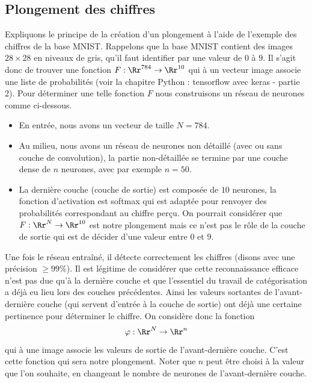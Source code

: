 \documentclass[11pt,class=report,crop=false]{standalone}
\begin{document}
\subsection{Plongement des chiffres}

Expliquons le principe de la création d'un plongement à l'aide de l'exemple des chiffres de la base MNIST.
Rappelons que la base MNIST contient des images $28 \times 28$ en niveaux de gris, qu'il faut identifier par une valeur de $0$ à $9$. Il s'agit donc de trouver une fonction $F : \Rr^{784} \to \Rr^{10}$ qui à un vecteur image associe une liste de probabilités (voir la chapitre \og{}Python : tensorflow avec keras - partie 2\fg{}).
Pour déterminer une telle fonction $F$ nous construisons un réseau de neurones comme ci-dessous.



\begin{itemize}
	\item En entrée, nous avons un vecteur de taille $N = 784$.
	
	\item Au milieu, nous avons un réseau de neurones non détaillé (avec ou sans couche de convolution), la partie non-détaillée se termine par une couche dense de $n$ neurones, avec par exemple $n=50$. 
	
	\item La dernière couche (couche de sortie) est composée de $10$ neurones, la fonction d'activation est softmax qui est adaptée pour renvoyer des probabilités correspondant au chiffre perçu. On pourrait considérer que $F : \Rr^N \to \Rr^{10}$ est notre plongement mais ce n'est pas le rôle de la couche de sortie qui est de décider d'une valeur entre $0$ et $9$.
	
\end{itemize}
	
Une fois le réseau entraîné, il détecte correctement les chiffres (disons avec une précision $\ge 99\%$). Il est légitime de considérer que cette reconnaissance efficace n'est pas due qu'à la dernière couche et que l'essentiel du travail de catégorisation a déjà eu lieu lors des couches précédentes.
Ainsi les valeurs sortantes de l'avant-dernière couche (qui servent d'entrée à la couche de sortie) ont déjà une certaine pertinence pour déterminer le chiffre.
On considère donc la fonction 
$$\varphi : \Rr^N \to \Rr^n$$
qui à une image associe les valeurs de sortie de l'avant-dernière couche. C'est cette fonction qui sera notre plongement.
Noter que $n$ peut être choisi à la valeur que l'on souhaite, en changeant le nombre de neurones de l'avant-dernière couche.
\end{document}

